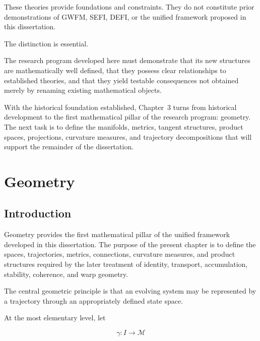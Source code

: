 \documentclass[12pt,oneside]{book}
\begin{document}
These theories provide foundations and constraints. They do not
constitute prior demonstrations of GWFM, SEFI, DEFI, or the
unified framework proposed in this dissertation.

The distinction is essential.

The research program developed here must demonstrate that its
new structures are mathematically well defined, that they
possess clear relationships to established theories, and that
they yield testable consequences not obtained merely by
renaming existing mathematical objects.

With the historical foundation established, Chapter~3 turns
from historical development to the first mathematical pillar of
the research program: geometry. The next task is to define the
manifolds, metrics, tangent structures, product spaces,
projections, curvature measures, and trajectory decompositions
that will support the remainder of the dissertation.

\chapter{Geometry}
\label{chap:geometry}


\section{Introduction}
\label{sec:geometry-introduction}

Geometry provides the first mathematical pillar of the unified
framework developed in this dissertation. The purpose of the
present chapter is to define the spaces, trajectories, metrics,
connections, curvature measures, and product structures required
by the later treatment of identity, transport, accumulation,
stability, coherence, and warp geometry.

The central geometric principle is that an evolving system may
be represented by a trajectory through an appropriately defined
state space.

At the most elementary level, let

\begin{equation}
    \gamma:
    I
    \rightarrow
    \mathcal{M}
    \label{eq:basic-worldline-map}
\end{equation}
\end{document}

